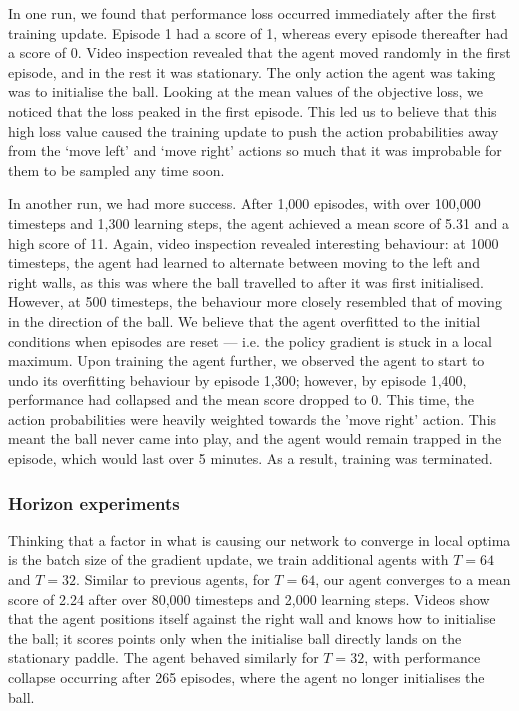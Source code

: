\documentclass[12pt,a4paper]{article}
\begin{document}
In one run, we found that performance loss occurred immediately after the first training update. Episode 1 had a score of 1, whereas every episode thereafter had a score of 0. Video inspection revealed that the agent moved randomly in the first episode, and in the rest it was stationary. The only action the agent was taking was to initialise the ball. Looking at the mean values of the objective loss, we noticed that the loss peaked in the first episode. This led us to believe that this high loss value caused the training update to push the action probabilities away from the `move left' and `move right' actions so much that it was improbable for them to be sampled any time soon.

In another run, we had more success. After 1,000 episodes, with over 100,000 timesteps and 1,300 learning steps, the agent achieved a mean score of 5.31 and a high score of 11. Again, video inspection revealed interesting behaviour: at 1000 timesteps, the agent had learned to alternate between moving to the left and right walls, as this was where the ball travelled to after it was first initialised. However, at 500 timesteps, the behaviour more closely resembled that of moving in the direction of the ball. We believe that the agent overfitted to the initial conditions when episodes are reset --- i.e. the policy gradient is stuck in a local maximum. Upon training the agent further, we observed the agent to start to undo its overfitting behaviour by episode 1,300; however, by episode 1,400, performance had collapsed and the mean score dropped to 0. This time, the action probabilities were heavily weighted towards the 'move right' action. This meant the ball never came into play, and the agent would remain trapped in the episode, which would last over 5 minutes. As a result, training was terminated. 

\subsubsection{Horizon experiments}
Thinking that a factor in what is causing our network to converge in local optima is the batch size of the gradient update, we train additional agents with $T = 64$ and $T = 32$. Similar to previous agents, for $T = 64$, our agent converges to a mean score of 2.24 after over 80,000 timesteps and 2,000 learning steps. Videos show that the agent positions itself against the right wall and knows how to initialise the ball; it scores points only when the initialise ball directly lands on the stationary paddle. The agent behaved similarly for $T = 32$, with performance collapse occurring after 265 episodes, where the agent no longer initialises the ball. 
\end{document}
